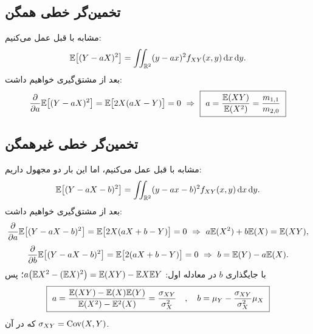 \subsection{تخمین‌گر  خطی همگن}
\begin{question}[{متغیرهای $X,Y$ با چگالی مشترک معلوم $f_{XY}$ را در نظر بگیرید. می‌خواهیم $Y$ را به شکل $\hat Y=aX$ از روی $X$ تخمین بزنیم. ضریب $a$ را چنان بیابید که $\E[(Y-aX)^2]$ کمینه شود.}]
\begin{answer}
مشابه با قبل عمل می‌کنیم:
\[
\mathbb{E}\big[(Y-aX)^2\big]=\iint_{\mathbb{R}^2}(y-ax)^2f_{XY}(x,y)\,\mathrm{d} x\,\mathrm{d} y .
\]
بعد از مشتق‌گیری خواهیم داشت:
\[
\frac{\partial}{\partial a}\E\big[(Y-aX)^2\big]=\E\big[2X(aX-Y)\big]=0\ \Rightarrow\ \boxed{\ a=\frac{\E(XY)}{\E(X^2)}=\frac{m_{1,1}}{m_{2,0}}\ }
\]
\end{answer}
\end{question}

\subsection{تخمین‌گر  خطی غیرهمگن}
\begin{question}[{این بار $Y$ را به شکل $\hat Y=aX+b$ تخمین می‌زنیم. ضرایب $a,b$ را چنان بیابید که $\E[(Y-aX-b)^2]$ کمینه شود.}]
\begin{answer}
مشابه با قبل عمل می‌کنیم، اما این بار دو مجهول داریم:
\[
\mathbb{E}\big[(Y-aX-b)^2\big]=\iint_{\mathbb{R}^2}(y-ax-b)^2f_{XY}(x,y)\,\mathrm{d} x\,\mathrm{d} y .
\]
بعد از مشتق‌گیری خواهیم داشت:
\[
\frac{\partial}{\partial a}\E\big[(Y-aX-b)^2\big]=\E\big[2X(aX+b-Y)\big]=0\ \Rightarrow\ a\E(X^2)+b\E(X)=\E(XY),
\]
\[
\frac{\partial}{\partial b}\E\big[(Y-aX-b)^2\big]=\E\big[2(aX+b-Y)\big]=0\ \Rightarrow\ b=\E(Y)-a\E(X).
\]
با جایگذاری $b$ در معادله اول: $a\big(\mathbb{E} X^2-(\mathbb{E} X)^2\big)=\mathbb{E}(XY)-\mathbb{E} X\mathbb{E} Y$؛ پس
\[
\boxed{\ a=\frac{\E(XY)-\E(X)\E(Y)}{\E(X^2)-\E^2(X)}=\frac{\sigma_{XY}}{\sigma_X^2}\quad,\quad b=\mu_Y-\frac{\sigma_{XY}}{\sigma_X^2}\mu_X\ }
\]
که در آن $\sigma_{XY}=\operatorname{Cov}(X,Y)$.
\end{answer}
\end{question}

